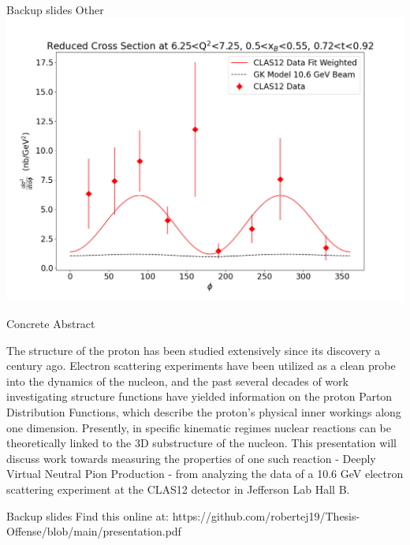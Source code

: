 \documentclass[aspectratio=169]{beamer}
\begin{document}
\begin{frame}{Backup slides}
\centering
Other\\

    \includegraphics[scale=0.2832]{DNP/finalfig2.png}\\
\end{frame}


\begin{frame}{Concrete Abstract}

The structure of the proton has been studied extensively since its discovery a century ago.  Electron scattering experiments have been utilized as a clean probe into the dynamics of the nucleon, and the past several decades of work investigating structure functions have yielded information on the proton Parton Distribution Functions, which describe the proton's physical inner workings along one dimension. Presently, in specific kinematic regimes nuclear reactions can be theoretically linked to the 3D substructure of the nucleon. This presentation will discuss work towards measuring the properties of one such reaction - Deeply Virtual Neutral Pion Production - from analyzing the data of a 10.6 GeV electron scattering experiment at the CLAS12 detector in Jefferson Lab Hall B. 

\end{frame}


\begin{frame}{Backup slides}
\centering
    Find this online at: https://github.com/robertej19/Thesis-Offense/blob/main/presentation.pdf
\end{frame}
\end{document}
